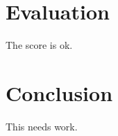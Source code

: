 \documentclass[11pt]{article}
\begin{document}
\section{Evaluation} 
The score is ok.

\section{Conclusion}
This needs work.



\end{document}
